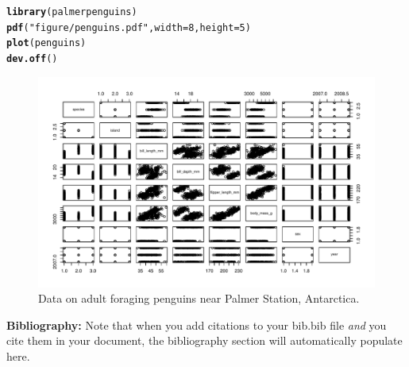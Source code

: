 \documentclass{article}\usepackage[]{graphicx}\usepackage[]{xcolor}
\makeatletter
\newcommand{\hlnum}[1]{\textcolor[rgb]{0.686,0.059,0.569}{#1}}%
\newcommand{\hlsng}[1]{\textcolor[rgb]{0.192,0.494,0.8}{#1}}%
\newcommand{\hldef}[1]{\textcolor[rgb]{0.345,0.345,0.345}{#1}}%
\newcommand{\hlkwc}[1]{\textcolor[rgb]{0.333,0.667,0.333}{#1}}%
\newcommand{\hlkwd}[1]{\textcolor[rgb]{0.737,0.353,0.396}{\textbf{#1}}}%
\newenvironment{kframe}{%
 \def\at@end@of@kframe{}%
 \ifinner\ifhmode%
  \def\at@end@of@kframe{\end{minipage}}%
  \begin{minipage}{\columnwidth}%
 \fi\fi%
 \def\FrameCommand##1{\hskip\@totalleftmargin \hskip-\fboxsep
 \colorbox{shadecolor}{##1}\hskip-\fboxsep
     \hskip-\linewidth \hskip-\@totalleftmargin \hskip\columnwidth}%
 \MakeFramed {\advance\hsize-\width
   \@totalleftmargin\z@ \linewidth\hsize
   \@setminipage}}%
 {\par\unskip\endMakeFramed%
 \at@end@of@kframe}
\newenvironment{knitrout}{}{} %
\makeatother
\begin{document}
\begin{knitrout}\scriptsize
{}\color{fgcolor}\begin{kframe}
\begin{alltt}
\hlkwd{library}\hldef{(palmerpenguins)}
\hlkwd{pdf}\hldef{(}\hlsng{"figure/penguins.pdf"}\hldef{,} \hlkwc{width} \hldef{=} \hlnum{8}\hldef{,} \hlkwc{height} \hldef{=} \hlnum{5}\hldef{)}
\hlkwd{plot}\hldef{(penguins)}
\hlkwd{dev.off}\hldef{()}
\end{alltt}
\end{kframe}
\end{knitrout}

\begin{figure}[H]
\begin{center}
\includegraphics[scale=0.8]{figure/penguins.pdf}
\caption{Data on adult foraging penguins near Palmer Station, Antarctica.}
\label{plot3}
\end{center}
\end{figure}


\vspace{2em}

\noindent\textbf{Bibliography:} Note that when you add citations to your bib.bib file \emph{and}
you cite them in your document, the bibliography section will automatically populate here.

\begin{tiny}

\end{tiny}

\newpage
\onecolumn
\end{document}
